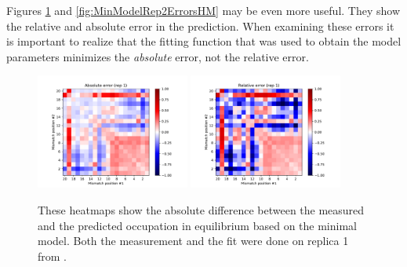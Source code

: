 Figures \ref{fig:MinModelRep1ErrorsHM} and \ref{fig:MinModelRep2ErrorsHM} %
may be even more useful. They show the relative and absolute error in the prediction. When examining these errors it is important to realize that the fitting function that was used to obtain the model parameters minimizes the \textit{absolute} error, not the relative error.

\begin{figure}
\begin{center}
\includegraphics[width=0.45\textwidth]{images/MinModelRep1AbsErr}
\includegraphics[width=0.45\textwidth]{images/MinModelRep1RelErr}
\caption{These heatmaps show the absolute difference between the measured and the predicted occupation in equilibrium based on the minimal model. Both the measurement and the fit were done on replica 1 from \cite{PNAS}.}
\label{fig:MinModelRep1ErrorsHM}
\end{center}
\end{figure}

